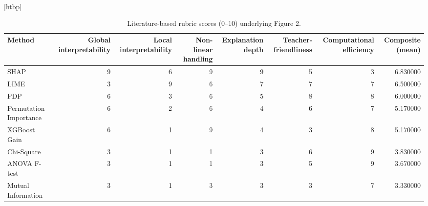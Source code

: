 \begin{table}
\small[htbp]
\caption{Literature-based rubric scores (0–10) underlying Figure 2.}
\label{tab:S17_xai_rubric}
\begin{tabular}{lrrrrrrr}
\toprule
Method & Global interpretability & Local interpretability & Non-linear handling & Explanation depth & Teacher-friendliness & Computational efficiency & Composite (mean) \\
\midrule
SHAP & 9 & 6 & 9 & 9 & 5 & 3 & 6.830000 \\
LIME & 3 & 9 & 6 & 7 & 7 & 7 & 6.500000 \\
PDP & 6 & 3 & 6 & 5 & 8 & 8 & 6.000000 \\
Permutation Importance & 6 & 2 & 6 & 4 & 6 & 7 & 5.170000 \\
XGBoost Gain & 6 & 1 & 9 & 4 & 3 & 8 & 5.170000 \\
Chi-Square & 3 & 1 & 1 & 3 & 6 & 9 & 3.830000 \\
ANOVA F-test & 3 & 1 & 1 & 3 & 5 & 9 & 3.670000 \\
Mutual Information & 3 & 1 & 3 & 3 & 3 & 7 & 3.330000 \\
\bottomrule
\end{tabular}
\end{table}
